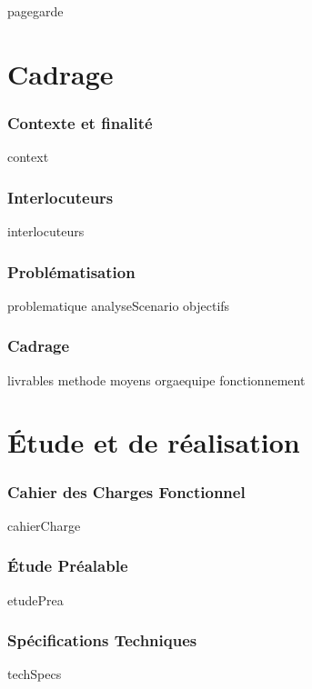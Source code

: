 \documentclass[a4paper, 12pt, titlepage, oneside, french]{article}
\begin{document}
{pagegarde}
\newpage

\tableofcontents
\newpage

\part{Cadrage}
\section{Contexte et finalité}
{context}
\newpage

\section{Interlocuteurs}
{interlocuteurs}
\newpage

\section{Problématisation}
{problematique}
{analyseScenario}
{objectifs}
\newpage

\section{Cadrage}
{livrables}
{methode}
{moyens}
{orgaequipe}
{fonctionnement}
\newpage


\part{Étude et de réalisation}

\section{Cahier des Charges Fonctionnel}
{cahierCharge}
\newpage

\section{Étude Préalable}
{etudePrea}
\newpage

\section{Spécifications Techniques}
{techSpecs}
\newpage
\end{document}
